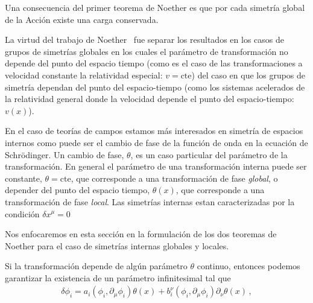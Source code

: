 Una consecuencia del primer teorema de Noether es que por cada simetría global de la Acción existe una carga conservada. 




La virtud del trabajo de Noether~\cite{Noether} fue separar los resultados  en los casos de grupos de simetrías globales en los cuales el parámetro de transformación no depende del punto del espacio tiempo (como es el caso de las transformaciones a velocidad constante la relatividad especial: $v=\text{cte}$) del caso en que los grupos de simetría dependan del punto del espacio-tiempo (como los sistemas acelerados de la relatividad general donde la velocidad depende el punto del espacio-tiempo: $v(x)$).

En el caso de teorías de campos estamos más interesados en simetría de espacios internos como puede ser el cambio de fase de la función de onda en la ecuación de Schrödinger. Un cambio de fase, $\theta$, es un caso particular del parámetro de la transformación. En general el parámetro de una transformación interna puede ser constante, $\theta=\text{cte}$, que corresponde a una transformación de fase  \emph{global}, o depender del punto del espacio tiempo, $\theta(x)$, que corresponde  a una transformación  de fase \emph{local}. Las simetrías internas estan caracterizadas por la condición $\delta x^\mu=0$ 

Nos enfocaremos en esta sección en la formulación de los dos teoremas de Noether para el caso de simetrías internas globales y locales.   


Si la transformación depende de algún parámetro $\theta$ continuo, entonces podemos garantizar la existencia de un parámetro infinitesimal tal que
\begin{align}
\label{eq:infdt}
 \delta\phi_i= a_{i}\left( \phi_{i},\partial_{\mu}\phi_{i} \right) \theta(x)+b^{\nu}_i \left( \phi_{i},\partial_{\mu}\phi_{i} \right) \partial_{\nu}\theta(x)\,,
\end{align}


